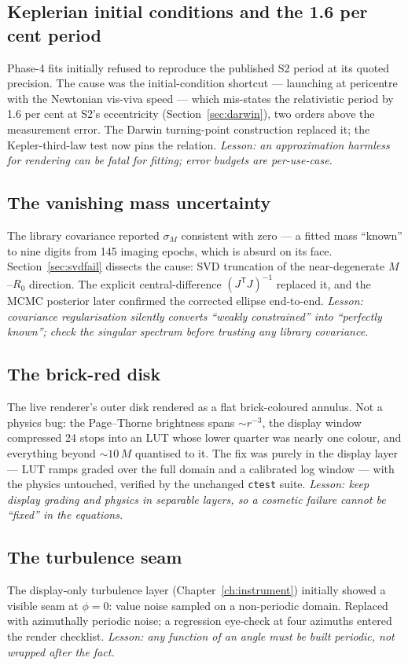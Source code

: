 \subsection{Keplerian initial conditions and the 1.6 per cent period}
Phase-4 fits initially refused to reproduce the published S2 period at
its quoted precision. The cause was the initial-condition shortcut —
launching at pericentre with the Newtonian vis-viva speed — which
mis-states the relativistic period by 1.6 per cent at S2's eccentricity
(Section~\ref{sec:darwin}), two orders above the measurement error. The
Darwin turning-point construction replaced it; the Kepler-third-law
test now pins the relation. \emph{Lesson: an approximation harmless for
rendering can be fatal for fitting; error budgets are per-use-case.}

\subsection{The vanishing mass uncertainty}
The library covariance reported $\sigma_M$ consistent with zero — a
fitted mass ``known'' to nine digits from 145 imaging epochs, which is
absurd on its face. Section~\ref{sec:svdfail} dissects the cause: SVD
truncation of the near-degenerate $M$--$R_0$ direction. The explicit
central-difference $(J^{\mathsf T}J)^{-1}$ replaced it, and the MCMC
posterior later confirmed the corrected ellipse end-to-end.
\emph{Lesson: covariance regularisation silently converts ``weakly
constrained'' into ``perfectly known''; check the singular spectrum
before trusting any library covariance.}

\subsection{The brick-red disk}
The live renderer's outer disk rendered as a flat brick-coloured
annulus. Not a physics bug: the Page--Thorne brightness spans
$\sim r^{-3}$, the display window compressed 24 stops into an LUT whose
lower quarter was nearly one colour, and everything beyond $\sim 10\,M$
quantised to it. The fix was purely in the display layer — LUT ramps
graded over the full domain and a calibrated log window — with the
physics untouched, verified by the unchanged \texttt{ctest} suite.
\emph{Lesson: keep display grading and physics in separable layers, so
a cosmetic failure cannot be ``fixed'' in the equations.}

\subsection{The turbulence seam}
The display-only turbulence layer (Chapter~\ref{ch:instrument})
initially showed a visible seam at $\phi = 0$: value noise sampled on a
non-periodic domain. Replaced with azimuthally periodic noise; a
regression eye-check at four azimuths entered the render checklist.
\emph{Lesson: any function of an angle must be built periodic, not
wrapped after the fact.}

